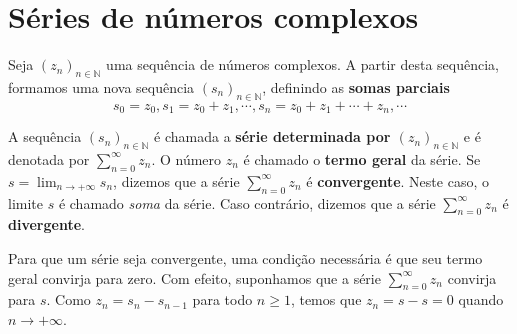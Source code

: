 








\chapter{Séries de números complexos}


Seja $(z_n)_{n \in \mathbb{N}}$ uma sequência de números complexos. A partir desta sequência, formamos uma nova sequência $(s_n)_{n \in \mathbb{N}}$, definindo as \textbf{somas parciais}
$$s_0 = z_0, s_1=z_0+z_1, \cdots , s_n = z_0 +z_1 + \cdots + z_n, \cdots$$

A sequência $(s_n)_{n \in \mathbb{N}}$ é chamada a \textbf{série determinada por $(z_n)_{n \in \mathbb{N}}$} e é denotada por $\displaystyle\sum_{n=0}^{\infty}z_n$. O número $z_n$ é chamado o \textbf{termo geral} da série. Se $s = \displaystyle\lim_{n \to + \infty} s_n$, dizemos que a série $\displaystyle\sum_{n=0}^{\infty}z_n$ é \textbf{convergente}. Neste caso, o limite $s$ é chamado \textit{soma} da série. Caso contrário, dizemos que a série $\displaystyle\sum_{n=0}^{\infty}z_n$ é \textbf{divergente}.

Para que um série seja convergente, uma condição necessária é que seu termo geral convirja para zero. Com efeito, suponhamos que a série $\displaystyle\sum_{n=0}^{\infty}z_n$ convirja para $s$. Como $z_n = s_n - s_{n-1}$ para todo $n \geq 1$, temos que $z_n = s-s = 0$ quando $n \to + \infty$.




